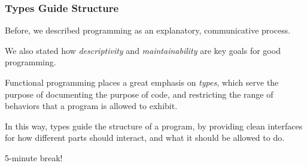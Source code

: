 \documentclass[aspectratio=169, handout]{beamer}
\begin{document}
\begin{frame}[fragile]
  \frametitle{Types Guide Structure}

  Before, we described programming as an explanatory, communicative process.

  \pause
  \vspace{\fill}

  We also stated how \textit{descriptivity} and \textit{maintainability} are
  key goals for good programming.

  \pause
  \vspace{\fill}

  Functional programming places a great emphasis on \textit{types}, which serve
  the purpose of documenting the purpose of code, and restricting the range of
  behaviors that a program is allowed to exhibit.

  \pause
  \vspace{\fill}

  In this way, types guide the structure of a program, by providing clean interfaces
  for how different parts should interact, and what it should be allowed to do.

\end{frame}




\begin{frame}[plain]

  \begin{center}
    \Large 5-minute break!
  \end{center}

\end{frame}

\end{document}
